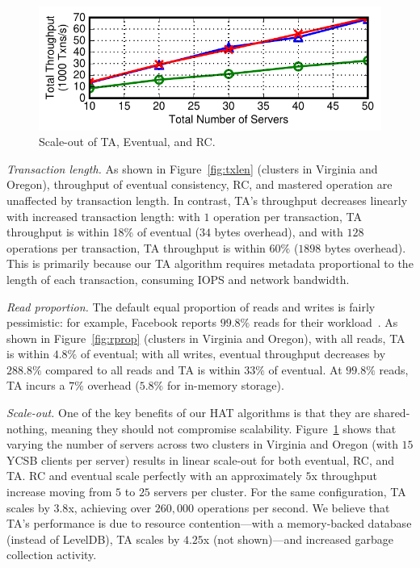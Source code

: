 \begin{figure}[t!]
\begin{center}
\includegraphics[width=\figfactor\columnwidth]{figs/finals/scaleout-thru.pdf}
\end{center}\vspace{-2.25em}
\caption{Scale-out of TA, Eventual, and RC.}
\label{fig:scaleout}
\end{figure}

\vspace{.5em}\noindent\textit{Transaction length.} As shown in
Figure~\ref{fig:txlen} (clusters in Virginia and Oregon), throughput
of eventual consistency, RC, and mastered operation are unaffected by
transaction length. In contrast, TA's throughput decreases linearly
with increased transaction length: with $1$ operation per transaction,
TA throughput is within 18\% of eventual ($34$ bytes overhead), and
with $128$ operations per transaction, TA throughput is within $60\%$
($1898$ bytes overhead). This is primarily because our TA algorithm
requires metadata proportional to the length of each transaction,
consuming IOPS and network bandwidth.


\vspace{.5em}\noindent\textit{Read proportion.} The default equal
proportion of reads and writes is fairly pessimistic: for example,
Facebook reports $99.8\%$ reads for their workload~\cite{eiger}. As
shown in Figure~\ref{fig:rprop} (clusters in Virginia and Oregon),
with all reads, TA is within $4.8\%$ of eventual; with all writes,
eventual throughput decreases by $288.8\%$ compared to all reads and
TA is within $33\%$ of eventual. At $99.8\%$ reads, TA incurs a $7\%$
overhead ($5.8\%$ for in-memory storage).



\vspace{.5em}\noindent\textit{Scale-out.} One of the key benefits of
our HAT algorithms is that they are shared-nothing, meaning they
should not compromise scalability. Figure~\ref{fig:scaleout} shows
that varying the number of servers across two clusters in Virginia and
Oregon (with $15$ YCSB clients per server) results in linear scale-out
for both eventual, RC, and TA. RC and eventual scale perfectly with an
approximately $5$x throughput increase moving from $5$ to $25$ servers
per cluster. For the same configuration, TA scales by $3.8$x,
achieving over $260,000$ operations per second. We believe that TA's
performance is due to resource contention---with a memory-backed
database (instead of LevelDB), TA scales by $4.25$x (not shown)---and
increased garbage collection activity.

